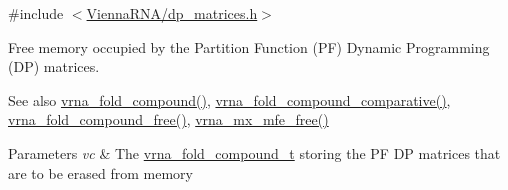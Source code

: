 {\ttfamily \#include $<$\mbox{\hyperlink{dp__matrices_8h}{Vienna\+R\+N\+A/dp\+\_\+matrices.\+h}}$>$}



Free memory occupied by the Partition Function (PF) Dynamic Programming (DP) matrices. 

\begin{DoxySeeAlso}{See also}
\mbox{\hyperlink{group__fold__compound_ga6601d994ba32b11511b36f68b08403be}{vrna\+\_\+fold\+\_\+compound()}}, \mbox{\hyperlink{group__fold__compound_gad6bacc816af274922b13d947f708aa0c}{vrna\+\_\+fold\+\_\+compound\+\_\+comparative()}}, \mbox{\hyperlink{group__fold__compound_gadded6039d63f5d6509836e20321534ad}{vrna\+\_\+fold\+\_\+compound\+\_\+free()}}, \mbox{\hyperlink{group__dp__matrices_ga6a9422feb5dfe5c64050cebf447672d0}{vrna\+\_\+mx\+\_\+mfe\+\_\+free()}}
\end{DoxySeeAlso}

\begin{DoxyParams}{Parameters}
{\em vc} & The \mbox{\hyperlink{group__fold__compound_ga1b0cef17fd40466cef5968eaeeff6166}{vrna\+\_\+fold\+\_\+compound\+\_\+t}} storing the PF DP matrices that are to be erased from memory \\
\hline
\end{DoxyParams}
